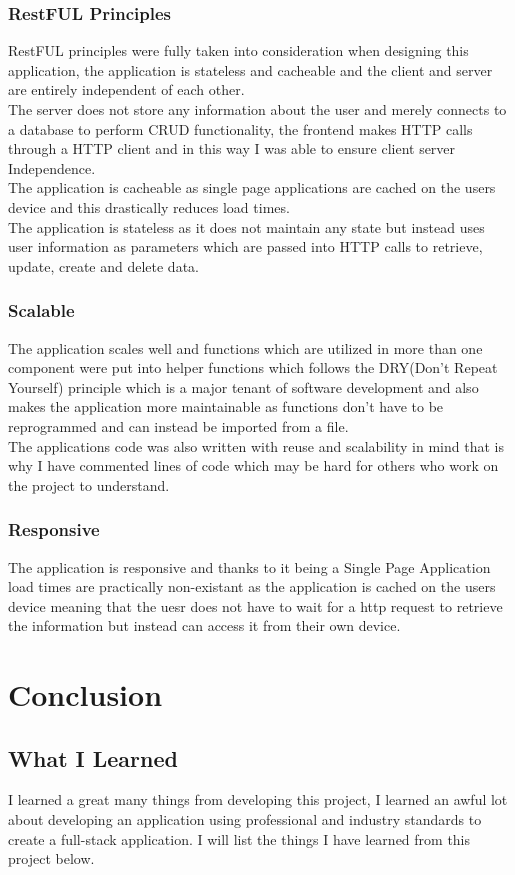 \subsection{RestFUL Principles}
RestFUL principles were fully taken into consideration when designing this application,
the application is stateless and cacheable and the client and server are entirely independent of each other.
\\
 The server does not store any information
about the user and merely connects to a database to perform CRUD functionality, the
frontend makes HTTP calls through a HTTP client and in this way I was able to ensure
client server Independence.
\\
The application is cacheable as single page applications are cached on the users
device and this drastically reduces load times.
\\
The application is stateless as it does not maintain any state but instead uses
user information as parameters which are passed into HTTP calls to retrieve, update,
create and delete data.
\subsection{Scalable}
The application scales well and functions which are utilized in more than one component
were put into helper functions which follows the DRY(Don't Repeat Yourself) principle
which is a major tenant of software development and also makes the application more
maintainable as functions don't have to be reprogrammed and can instead be imported from
a file.
\\
The applications code was also written with reuse and scalability in mind that is why
I have commented lines of code which may be hard for others who work on the project to
understand.
\subsection{Responsive}
The application is responsive and thanks to it being a Single Page Application load times are
practically non-existant as the application is cached on the users device meaning that the
uesr does not have to wait for a http request to retrieve the information but instead can access
it from their own device.

\chapter{Conclusion}
\section{What I Learned}
I learned a great many things from developing this project, I learned an awful lot about developing an application using professional and industry standards to create a full-stack application.  I will list the things I have learned from this project below.
